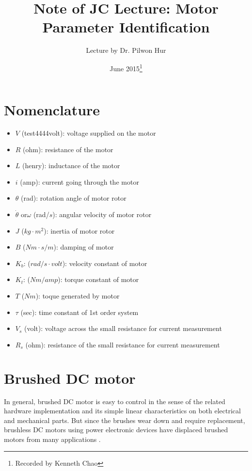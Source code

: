 \documentclass{article}
\title{Note of JC Lecture: Motor Parameter Identification}
\author{Lecture by Dr. Pilwon Hur}
\date{June 2015\footnote{Recorded by Kenneth Chao}}
\begin{document}
\maketitle

\section*{Nomenclature}
\begin{itemize}
\item[] $V$ (test4444volt): voltage supplied on the motor
\item[] $R$ (ohm): resistance of the motor
\item[] $L$ (henry): inductance of the motor
\item[] $i$ (amp): current going through the motor
\item[] $\theta$ (rad): rotation angle of motor rotor
\item[] $\dot\theta$ or$\omega$ (rad/$s$): angular velocity of motor rotor
\item[] $J$ ($kg\cdot m^2$): inertia of motor rotor
\item[] $B$ ($Nm\cdot s/m$): damping of motor
\item[] $K_b$: ($rad/s\cdot volt$): velocity constant of motor
\item[] $K_t$: ($Nm/amp$): torque constant of motor
\item[] $T$ ($Nm$): toque generated by motor
\item[] $\tau$ (sec): time constant of 1st order system
\item[] $V_s$ (volt): voltage across the small resistance for current measurement
\item[] $R_s$ (ohm): resistance of the small resistance for current measurement
\end{itemize}
\section{Brushed DC motor}
In general, brushed DC motor is easy to control in the sense of the related hardware implementation and its simple linear characteristics on both electrical and mechanical parts. But since the brushes wear down and require replacement, brushless DC motors using power electronic devices have displaced brushed motors from many applications \cite{WikiDCM}.
\end{document}
